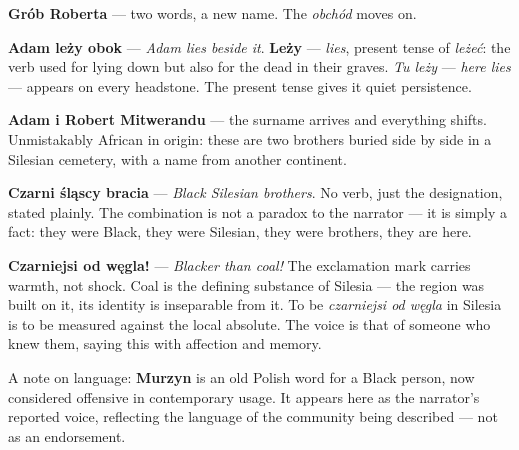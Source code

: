 

\textbf{Grób Roberta} --- two words, a new name. The \textit{obchód}
moves on.

\textbf{Adam leży obok} --- \textit{Adam lies beside it}.
\textbf{Leży} --- \textit{lies}, present tense of \textit{leżeć}:
the verb used for lying down but also for the dead in their graves.
\textit{Tu leży} --- \textit{here lies} --- appears on every headstone.
The present tense gives it quiet persistence.

\textbf{Adam i Robert Mitwerandu} --- the surname arrives and
everything shifts. Unmistakably African in origin: these are two
brothers buried side by side in a Silesian cemetery, with a name from
another continent.

\textbf{Czarni śląscy bracia} --- \textit{Black Silesian brothers}.
No verb, just the designation, stated plainly. The combination is not
a paradox to the narrator --- it is simply a fact: they were Black,
they were Silesian, they were brothers, they are here.

\textbf{Czarniejsi od węgla!} --- \textit{Blacker than coal!} The
exclamation mark carries warmth, not shock. Coal is the defining
substance of Silesia --- the region was built on it, its identity is
inseparable from it. To be \textit{czarniejsi od węgla} in Silesia
is to be measured against the local absolute. The voice is that of
someone who knew them, saying this with affection and memory.



A note on language: \textbf{Murzyn} is an old Polish word for a Black
person, now considered offensive in contemporary usage. It appears here
as the narrator's reported voice, reflecting the language of the
community being described --- not as an endorsement.

